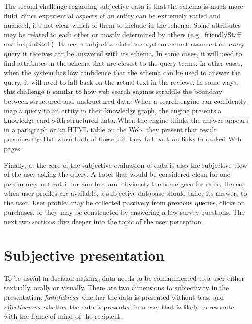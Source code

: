 \documentclass[11pt]{article}
\begin{document}
The second challenge regarding subjective data is that the schema is much more fluid. Since experiential aspects of an entity can be extremely varied and nuanced, it's not clear which of them to include in the schema. Some attributes may be related to each other or mostly determined by others (e.g., {\sc friendlyStaff} and {\sc helpfulStaff}). Hence, a subjective database system cannot assume that every query it receives can be answered with its schema. In some cases, it will need to find attributes in the schema that are closest to the query terms. In other cases, when the system has low confidence that the schema can be used to answer the query, it will need to fall back on the actual text in the reviews. In some ways, this challenge is similar to how web search engines straddle the boundary between structured and unstructured data.  When a search engine can confidently map a query to an entity in their knowledge graph, the engine presents a knowledge card with structured data.  When the engine thinks the answer appears in a paragraph or an HTML table on the Web, they present that result prominently. But when both of these fail, they fall back on links to ranked Web pages.  


Finally, at the core of the subjective evaluation of data is also the subjective view of the user asking the query.
A hotel that would be considered clean for one person may not cut it for another, and obviously the same goes for cafes. 
Hence, when  user profiles are available, a subjective database should tailor its answers to the user.
 User profiles may be collected passively from previous queries, clicks or purchases, or they may be constructed by answering a few survey questions.
 The next two sections dive deeper into the topic of the user perception. 

\section{Subjective presentation}
To be useful in decision making, data needs to be communicated to a user either textually, orally or visually.  There are two dimensions to subjectivity in the presentation: {\em faithfulness}--whether the data is presented  without bias, and {\em effectiveness}--whether the data is presented in a way that is likely to resonate with the frame of mind of the recipient.
\end{document}
